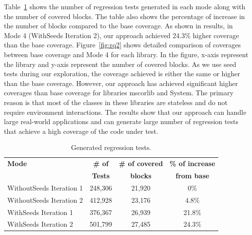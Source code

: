 Table~\ref{tab:gentests} shows the number of regression tests generated in each mode along with the number of covered blocks. The table also shows the percentage of increase
in the number of blocks compared to the base coverage. As shown in results, in Mode 4 (WithSeeds Iteration 2), our approach achieved 24.3\% higher coverage than the base coverage. Figure~\ref{fig:rq2} shows detailed comparison of coverages between base coverage and Mode 4 for each library. In the figure, x-axis represent the library and y-axis represent the number of covered blocks. As we use seed tests during our exploration, the coverage achieved is either the same or higher than the base coverage. However, our approach has achieved significant higher coverages than base coverage for libraries mscorlib and System. The primary reason is that most of the classes in these libraries are stateless and do not require environment interactions. The results show that our approach can handle large real-world applications and can generate large number of regression tests that achieve a high coverage of the code under test.

\setlength{\tabcolsep}{1pt}
\begin{table}[t]
\begin{SmallOut}
\begin{CodeOut}
\begin{center}
\begin {tabular} {|l|c|c|c|}
\hline
\textbf{Mode} & \textbf{\# of} & \textbf{\# of covered} & \textbf{\% of increase}\\  
 & \textbf{Tests} & \textbf{blocks} & \textbf{from base}\\  
\hline
\hline  WithoutSeeds Iteration 1 & 248,306 & 21,920 & 0\%\\
\hline  WithoutSeeds Iteration 2 & 412,928 & 23,176 & 4.8\%\\
\hline  WithSeeds Iteration 1 & 376,367 & 26,939 & 21.8\%\\
\hline  WithSeeds Iteration 2 & 501,799 & 27,485 & 24.3\%\\
\hline
\end{tabular}
\end{center}
\end{CodeOut}
\end{SmallOut}\vspace*{-4ex}
\centering \caption {\label{tab:gentests}Generated regression tests.}
\end{table}

